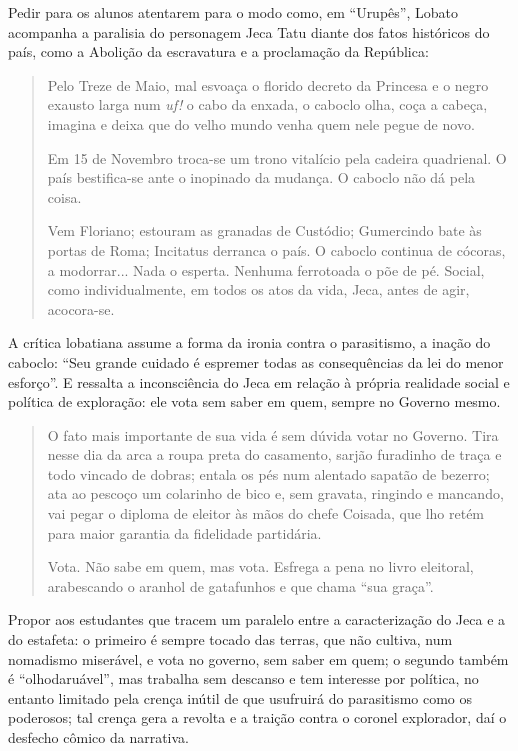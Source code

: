 \documentclass[11pt]{extarticle}
\begin{document}
Pedir para os alunos atentarem para o modo como, em ``Urupês'', Lobato
acompanha a paralisia do personagem Jeca Tatu diante dos fatos
históricos do país, como a Abolição da escravatura e a proclamação da
República:

\begin{quote}
Pelo Treze de Maio, mal esvoaça o florido decreto da Princesa e o negro
exausto larga num \emph{uf!} o cabo da enxada, o caboclo olha, coça a
cabeça, imagina e deixa que do velho mundo venha quem nele pegue de
novo.

Em 15 de Novembro troca-se um trono vitalício pela cadeira quadrienal. O
país bestifica-se ante o inopinado da mudança. O caboclo não dá pela
coisa.

Vem Floriano; estouram as granadas de Custódio; Gumercindo bate às
portas de Roma; Incitatus derranca o país. O caboclo continua de
cócoras, a modorrar... Nada o esperta. Nenhuma ferrotoada o põe de pé.
Social, como individualmente, em todos os atos da vida, Jeca, antes de
agir, acocora-se.
\end{quote}

A crítica lobatiana assume a forma da ironia contra o parasitismo, a
inação do caboclo: ``Seu grande cuidado é espremer todas as
consequências da lei do menor esforço''. E ressalta a inconsciência do
Jeca em relação à própria realidade social e política de exploração: ele
vota sem saber em quem, sempre no Governo mesmo.

\begin{quote}
O fato mais importante de sua vida é sem dúvida votar no Governo. Tira
nesse dia da arca a roupa preta do casamento, sarjão furadinho de traça
e todo vincado de dobras; entala os pés num alentado sapatão de bezerro;
ata ao pescoço um colarinho de bico e, sem gravata, ringindo e mancando,
vai pegar o diploma de eleitor às mãos do chefe Coisada, que lho retém
para maior garantia da fidelidade partidária.

Vota. Não sabe em quem, mas vota. Esfrega a pena no livro eleitoral,
arabescando o aranhol de gatafunhos e que chama ``sua graça''.
\end{quote}

Propor aos estudantes que tracem um paralelo entre a caracterização do
Jeca e a do estafeta: o primeiro é sempre tocado das terras, que não
cultiva, num nomadismo miserável, e vota no governo, sem saber em quem;
o segundo também é ``olhodaruável'', mas trabalha sem descanso e tem
interesse por política, no entanto limitado pela crença inútil de que
usufruirá do parasitismo como os poderosos; tal crença gera a revolta e
a traição contra o coronel explorador, daí o desfecho cômico da
narrativa.
\end{document}
